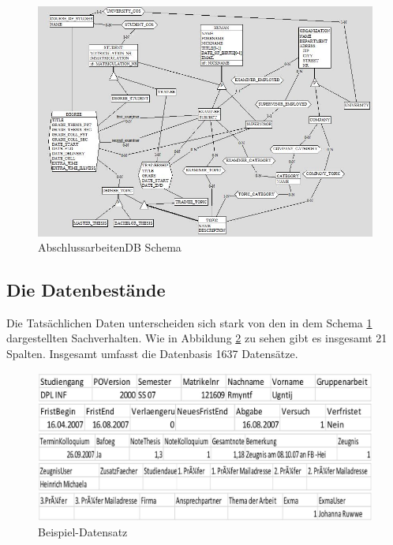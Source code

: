 \begin{figure}[H]
	\centering
	\includegraphics[scale=0.6]{images/01abschlussarbeitendbschema.jpg} 
	\caption{AbschlussarbeitenDB Schema}\label{fig:schema1}
\end{figure}

\subsection{Die Datenbestände}
Die Tats\"achlichen Daten unterscheiden sich stark von den in dem Schema \ref{fig:schema1} dargestellten Sachverhalten. Wie in Abbildung \ref{fig:schema2} zu sehen gibt es insgesamt 21 Spalten. Insgesamt umfasst die Datenbasis 1637 Datensätze. \\

\begin{figure}[H]
	\centering
	\includegraphics[scale=0.3]{images/01beispieldatensatzcsv.jpg} 
	\caption{Beispiel-Datensatz}\label{fig:schema2}
\end{figure}


